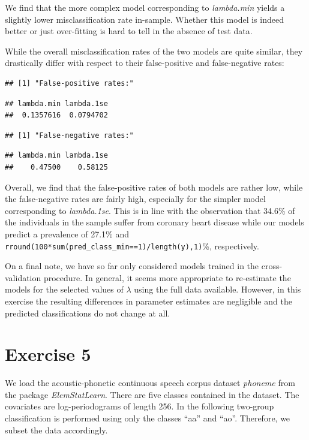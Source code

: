 \documentclass[
]{article}
\begin{document}
We find that the more complex model corresponding to \textit{lambda.min}
yields a slightly lower misclassification rate in-sample. Whether this
model is indeed better or just over-fitting is hard to tell in the
absence of test data.

While the overall misclassification rates of the two models are quite
similar, they drastically differ with respect to their false-positive
and false-negative rates:

\begin{verbatim}
## [1] "False-positive rates:"
\end{verbatim}

\begin{verbatim}
## lambda.min lambda.1se 
##  0.1357616  0.0794702
\end{verbatim}

\begin{verbatim}
## [1] "False-negative rates:"
\end{verbatim}

\begin{verbatim}
## lambda.min lambda.1se 
##    0.47500    0.58125
\end{verbatim}

Overall, we find that the false-positive rates of both models are rather
low, while the false-negative rates are fairly high, especially for the
simpler model corresponding to \textit{lambda.1se}. This is in line with
the observation that 34.6\% of the individuals in the sample suffer from
coronary heart disease while our models predict a prevalence of 27.1\%
and \texttt{rround(100*sum(pred\_class\_min==1)/length(y),1)}\%,
respectively.

On a final note, we have so far only considered models trained in the
cross-validation procedure. In general, it seems more appropriate to
re-estimate the models for the selected values of \(\lambda\) using the
full data available. However, in this exercise the resulting differences
in parameter estimates are negligible and the predicted classifications
do not change at all.

\hypertarget{exercise-5}{%
\section{Exercise 5}\label{exercise-5}}

We load the acoustic-phonetic continuous speech corpus dataset
\textit{phoneme} from the package \textit{ElemStatLearn}. There are five
classes contained in the dataset. The covariates are log-periodograms of
length 256. In the following two-group classification is performed using
only the classes ``aa'' and ``ao''. Therefore, we subset the data
accordingly.
\end{document}
